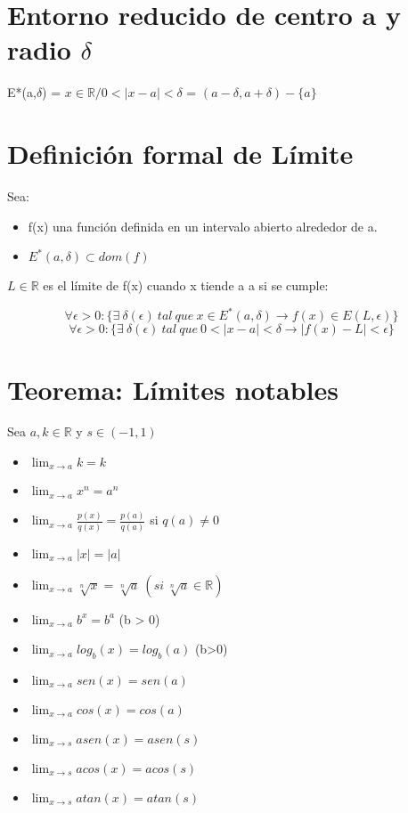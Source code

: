\documentclass{report}
\begin{document}
	\section{Entorno reducido de centro a y radio $\delta$}
		E*(a,$\delta$) = {$x \in \mathbb{R} / 0 < |x-a|<\delta$} = $(a-\delta,a+\delta) - \{a\}$
	
	\section{Definición formal de Límite}
	\label{definicion1}
		Sea:
		
	\begin{itemize}
		\item f(x) una función definida en un intervalo abierto alrededor de a.
		\item $E^{*}(a,\delta) \subset dom(f)$
	\end{itemize}
		
		$L \in \mathbb{R}$ es el límite de f(x) cuando x tiende a a si se cumple:
		
		$$\forall \epsilon > 0 : \{\exists  \ \delta(\epsilon) \ tal \ que \ x \in E^{*}(a,\delta) \rightarrow f(x) \in E(L,\epsilon)\}$$		
		$$\forall \epsilon > 0 : \{\exists  \ \delta(\epsilon) \ tal \ que \ 0 < |x-a| < \delta \rightarrow |f(x)-L| < \epsilon\}$$

	\section{Teorema: Límites notables}
		Sea $a, k \in \mathbb{R}$ y $ s \in (-1,1)$
		\begin{itemize}
			\item $\lim_{x \to a}k=k$
			\item $\lim_{x \to a}x^n=a^n$
			\item $\lim_{x \to a}\frac{p(x)}{q(x)}=\frac{p(a)}{q(a)}$ si $q(a) \neq 0$
			\item $\lim_{x \to a}|x|=|a|$
			\item $\lim_{x \to a}\sqrt[n]{x}=\sqrt[n]{a} \ (si \ \sqrt[n]{a} \in \mathbb{R})$
			\item $\lim_{x \to a}b^x=b^a$ (b > 0)
			\item $\lim_{x \to a}log_{b}(x)=log_{b}(a)$ (b>0)
			\item $\lim_{x \to a}sen(x)=sen(a)$
			\item $\lim_{x \to a}cos(x)=cos(a)$
			\item $\lim_{x \to s}asen(x)=asen(s)$
			\item $\lim_{x \to s}acos(x)=acos(s)$
			\item $\lim_{x \to s}atan(x)=atan(s)$
			
		\end{itemize}
	
\end{document}
